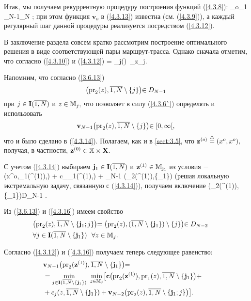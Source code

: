Итак, мы получаем рекуррентную процедуру построения функций (\ref{4.3.8}):
\bfn
  \label{4.3.13}
  _o\longrightarrow  {}_1\longrightarrow\cdots
  \longrightarrow {}_{N-1}\longrightarrow {}_N
  ;
\efn
при этом функция
$\mathbf{v}_o$ в (\ref{4.3.13}) известна
(см. (\ref{4.3.9})),
а каждый регулярный шаг данной процедуры реализуется посредством
(\ref{4.3.12}).

В заключение раздела совсем кратко рассмотрим построение оптимального
решения в виде соответствующей пары маршрут-трасса.
Однако сначала отметим,
что согласно (\ref{4.3.10}) и (\ref{4.3.12})
\bfn
  \label{4.3.14}
   = \min\limits_{j\in {}()}\
  \min\limits_{z\in\bbm_j}\bigl[\mathbf{c}\bigl(x^o,\mathrm{pr}_1(z),\ov{1,N}\bigl) +
  c_j(z,\ov{1,N}) + \mathbf{v}_{N-1}\bigl(\mathrm{pr}_2(z),\ov{1,N}\sm\{j\}\bigl)\bigl]
  .
\efn

Напомним, что согласно (\ref{3.6.13})
$$
  \bigl(\mathrm{pr}_2(z),\ov{1,N}\sm\{j\}\bigl)\in D_{N-1}
$$
при
$j\in\mathbf{I}(\ov{1,N})$ и $z\in{\mathbb M}_j,$
что позволяет в силу
(\ref{4.3.6`}) определять и использовать
$$
  \mathbf{v}_{N-1}\bigl(\mathrm{pr}_2(z),\ov{1,N}\sm\{j\}\bigl)\in[0,\infty[
  ,
$$
что и было сделано в (\ref{4.3.14}).
Полагаем, как и в \ref{sect:3.5}, что
$\mathbf{z}^{(o)}\stackrel{\triangle}{=} (x^o,x^o),$
получая, в частности,
$\mathbf{z}^{(0)}\in {\mathbb X}\times \mathbf{X}.$

С учетом (\ref{4.3.14})
выбираем
$\mathbf{j}_1\in \mathbf{I}(\ov{1,N})$ и
$\mathbf{z}^{(1)}\in \bbm_{_1}$
из условия
\bfn
  \label{4.3.15}
  = \bigl(x^o,_1(^{(1)}),\bigl) +
  c_{_1}(^{(1)},) + \mathbf{v}_{N-1}
  \bigl(\mathrm{pr}_2(\mathbf{z}^{(1)}),\ov{1,N}\sm\{\mathbf{j}_1\}\bigl)
\efn
(решая локальную экстремальную задачу, связанную с (\ref{4.3.14})),
получаем включение
\bfn
  \label{4.3.16}
  \bigl(_2(^{(1)}),\sm\{_1\}\bigl)\in D_{N-1}
  .
\efn

Из (\ref{3.6.13}) и (\ref{4.3.16})
имеем свойство
\begin{eqnarray}
  &\bigl(\mathrm{pr}_2(z),\ov{1,N}\sm\{\mathbf{j}_1;j\}\bigl) =
  \bigl(\mathrm{pr}_2(z),(\ov{1,N}\sm
  \{\mathbf{j}_1\})\sm\{j\}\bigl)\in D_{N-2}\ \
  &\nonumber\\
  &\fa j\in
  \mathbf{I}(\ov{1,N}\sm\{\mathbf{j}_1\})\
  \ \fa z\in \bbm_j
  .
\end{eqnarray}

Согласно (\ref{4.3.12}) и (\ref{4.3.16})
получаем теперь следующее равенство:
\begin{eqnarray}
  &\mathbf{v}_{N-1}\bigl(\mathrm{pr}_2(\mathbf{z}^{(1)}),\ov{1,N}\sm\{\mathbf{j}_1\}
  \bigl)=
  &\nonumber\\
  &=\min\limits_{j\in\mathbf{I}(\ov{1,N}\sm\{\mathbf{j}_1\})}\
  \min\limits_{z\in\bbm_j}\bigl[\mathbf{c}\bigl(\mathrm{pr}_2(\mathbf{z}^{(1)}),\mathrm{pr}_1(z),
  \ov{1,N}\sm \{\mathbf{j}_1\}\bigl) +
  &\nonumber\\
  &+ c_j(z,\ov{1,N}\sm\{\mathbf{j}_1\}) +
  \mathbf{v}_{N-2}\bigl(\mathrm{pr}_2(z),\ov{1,N}\sm\{\mathbf{j}_1;j\}\bigl)\bigl]
  .
  &
  \label{4.3.17}
\end{eqnarray}

